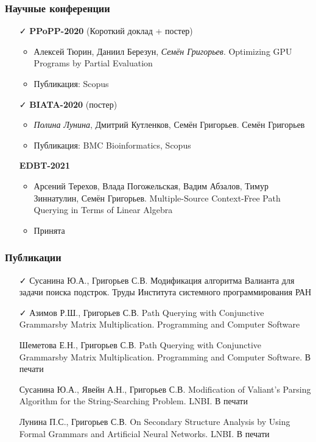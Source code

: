 \documentclass[xcolor=table]{beamer}
\begin{document}
\begin{frame}[fragile]

  \frametitle{Научные конференции}
      \begin{itemize}

      \item[\faCheck] \textbf{PPoPP-2020} (Короткий доклад + постер)
      \begin{itemize}
        \item Алексей Тюрин, Даниил Березун, \emph{Семён Григорьев}. Optimizing GPU Programs by Partial Evaluation
        \item Публикация: Scopus
      \end{itemize}

      \item[\faCheck] \textbf{BIATA-2020} (постер)
      \begin{itemize}
         \item \emph{Полина Лунина}, Дмитрий Кутленков, Семён Григорьев. Семён Григорьев
         \item Публикация: BMC Bioinformatics, Scopus
      \end{itemize}

      \item[\faHourglassHalf] \textbf{EDBT-2021} 
      \begin{itemize}
        \item Арсений Терехов, Влада Погожельская, Вадим Абзалов, Тимур Зиннатулин, Семён Григорьев. Multiple-Source Context-Free Path Querying in Terms of Linear Algebra
        \item Принята
      \end{itemize}

\end{itemize}
\end{frame}


\begin{frame}[fragile]

  \frametitle{Публикации}
\begin{itemize}
      \item[\faCheck] Сусанина Ю.А., Григорьев С.В. Модификация алгоритма Валианта для задачи поиска подстрок. Труды Института системного программирования РАН
      \item[\faCheck] Азимов Р.Ш., Григорьев С.В. Path Querying with Conjunctive Grammarsby Matrix Multiplication. Programming and Computer Software
      \item[\faHourglassHalf] Шеметова Е.Н., Григорьев С.В. Path Querying with Conjunctive Grammarsby Matrix Multiplication. Programming and Computer Software. В печати
      \item[\faHourglassHalf] Сусанина Ю.А., Явейн А.Н., Григорьев С.В. Modification of Valiant’s Parsing Algorithm for the String-Searching Problem. LNBI. В печати
      \item[\faHourglassHalf] Лунина П.С., Григорьев С.В. On Secondary Structure Analysis by Using Formal Grammars and Artificial Neural Networks. LNBI. В печати
\end{itemize}
\end{frame}
\end{document}
